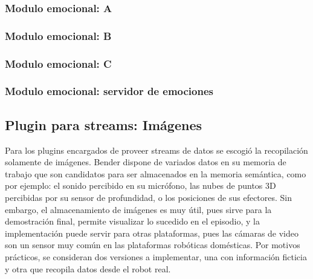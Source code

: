 
\subsubsection{Modulo emocional: A}

\subsubsection{Modulo emocional: B}

\subsubsection{Modulo emocional: C}

\subsubsection{Modulo emocional: servidor de emociones}


\subsection{Plugin para streams: Imágenes}


Para los plugins encargados de proveer streams de datos se escogió la recopilación solamente de imágenes. Bender dispone de variados datos en su memoria de trabajo que son candidatos para ser almacenados en la memoria semántica, como por ejemplo: el sonido percibido en su micrófono, las nubes de puntos 3D percibidas por su sensor de profundidad, o los posiciones de sus efectores. Sin embargo, el almacenamiento de imágenes es muy útil, pues sirve para la demostración final, permite visualizar lo sucedido en el episodio, y la implementación puede servir para otras plataformas, pues las cámaras de video son un sensor muy común en las plataformas robóticas domésticas. Por motivos prácticos, se consideran dos versiones a implementar, una con información ficticia y otra que recopila datos desde el robot real.

